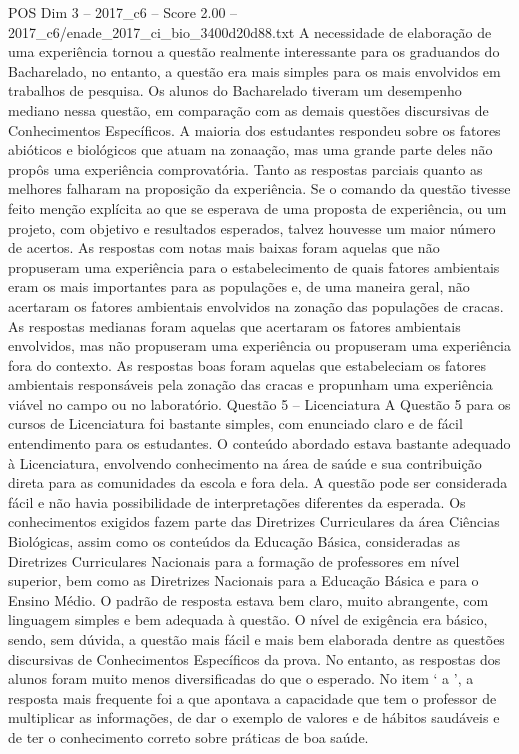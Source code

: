 \begin{textsample}{POS Dim 3 – 2017\_c6 – Score 2.00 – 2017\_c6/enade\_2017\_ci\_bio\_3400d20d88.txt}
A necessidade de elaboração de uma experiência tornou a questão realmente interessante para os graduandos do Bacharelado, no entanto, a questão era mais simples para os mais envolvidos em trabalhos de pesquisa.
Os alunos do Bacharelado tiveram um desempenho mediano nessa questão, em comparação com as demais questões discursivas de Conhecimentos Específicos.
A maioria dos estudantes respondeu sobre os fatores abióticos e biológicos que atuam na zonaação, mas uma grande parte deles não propôs uma experiência comprovatória.
Tanto as respostas parciais quanto as melhores falharam na proposição da experiência.
Se o comando da questão tivesse feito menção explícita ao que se esperava de uma proposta de experiência, ou um projeto, com objetivo e resultados esperados, talvez houvesse um maior número de acertos.
As respostas com notas mais baixas foram aquelas que não propuseram uma experiência para o estabelecimento de quais fatores ambientais eram os mais importantes para as populações e, de uma maneira geral, não acertaram os fatores ambientais envolvidos na zonação das populações de cracas.
As respostas medianas foram aquelas que acertaram os fatores ambientais envolvidos, mas não propuseram uma experiência ou propuseram uma experiência fora do contexto.
As respostas boas foram aquelas que estabeleciam os fatores ambientais responsáveis pela zonação das cracas e propunham uma experiência viável no campo ou no laboratório.
Questão 5 – Licenciatura A Questão 5 para os cursos de Licenciatura foi bastante simples, com enunciado claro e de fácil entendimento para os estudantes.
O conteúdo abordado estava bastante adequado à Licenciatura, envolvendo conhecimento na área de saúde e sua contribuição direta para as comunidades da escola e fora dela.
A questão pode ser considerada fácil e não havia possibilidade de interpretações diferentes da esperada.
Os conhecimentos exigidos fazem parte das Diretrizes Curriculares da área Ciências Biológicas, assim como os conteúdos da Educação Básica, consideradas as Diretrizes Curriculares Nacionais para a formação de professores em nível superior, bem como as Diretrizes Nacionais para a Educação Básica e para o Ensino Médio.
O padrão de resposta estava bem claro, muito abrangente, com linguagem simples e bem adequada à questão.
O nível de exigência era básico, sendo, sem dúvida, a questão mais fácil e mais bem elaborada dentre as questões discursivas de Conhecimentos Específicos da prova.
No entanto, as respostas dos alunos foram muito menos diversificadas do que o esperado.
No item ‘ a ’, a resposta mais frequente foi a que apontava a capacidade que tem o professor de multiplicar as informações, de dar o exemplo de valores e de hábitos saudáveis e de ter o conhecimento correto sobre práticas de boa saúde.

\end{textsample}
